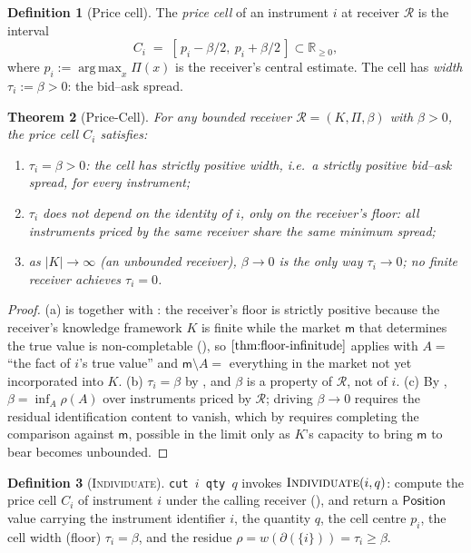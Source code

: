 \documentclass[11pt,a4paper]{article}
\theoremstyle{thmstyle}
\newtheorem{theorem}{Theorem}[section]
\theoremstyle{definition}
\newtheorem{definition}[theorem]{Definition}
\theoremstyle{remark}
\newcommand{\R}{\mathbb{R}}
\newcommand{\wt}{w}
\newcommand{\flo}{\beta}
\newcommand{\res}{\rho}
\newcommand{\cut}{\partial}
\newcommand{\medium}{\mathsf{m}}
\newcommand{\sh}[1]{\texttt{#1}}
\newcommand{\abs}[1]{\lvert#1\rvert}
\newcommand{\Rec}{\mathcal{R}}
\DeclareMathOperator*{\argmax}{arg\,max}
\begin{document}
\begin{definition}[Price cell]
\label{def:price-cell}
The \emph{price cell} of an instrument $i$ at receiver $\Rec$ is the
interval
\[
C_i \;=\; [\,p_i - \flo/2,\ p_i + \flo/2\,] \subset \R_{\ge0},
\]
where $p_i:=\argmax_x\Pi(x)$ is the receiver's central estimate. The
cell has \emph{width} $\tau_i:=\flo>0$: the bid--ask spread.
\end{definition}

\begin{theorem}[Price-Cell]
\label{thm:price-cell}
For any bounded receiver $\Rec=(K,\Pi,\flo)$ with $\flo>0$, the price
cell $C_i$ satisfies:
\begin{enumerate}[label=\textup{(\alph*)},leftmargin=2em]
\item $\tau_i=\flo>0$: the cell has strictly positive width, i.e.\ a
strictly positive bid--ask spread, for every instrument;
\item $\tau_i$ does not depend on the identity of $i$, only on the
receiver's floor: all instruments priced by the same receiver share the
same minimum spread;
\item as $\abs{K}\to\infty$ (an unbounded receiver), $\flo\to0$ is the
only way $\tau_i\to0$; no finite receiver achieves $\tau_i=0$.
\end{enumerate}
\end{theorem}

\begin{proof}
(a) is  together with : the
receiver's floor is strictly positive because the receiver's knowledge
framework $K$ is finite while the market $\medium$ that determines the
true value is non-completable (), so
$\Cref{thm:floor-infinitude}$ applies with $A=$ ``the fact of $i$'s true
value'' and $\medium\setminus A=$ everything in the market not yet
incorporated into $K$. (b) $\tau_i=\flo$ by , and
$\flo$ is a property of $\Rec$, not of $i$. (c) By
, $\flo=\inf_A\res(A)$ over instruments priced by
$\Rec$; driving $\flo\to0$ requires the residual identification content
to vanish, which by  requires completing the
comparison against $\medium$, possible in the limit only as $K$'s
capacity to bring $\medium$ to bear becomes unbounded.
\end{proof}

\begin{definition}[\textsc{Individuate}]
\label{def:individuate}
\sh{cut\ $i$\ qty\ $q$} invokes $\textsc{Individuate}(i,q)$: compute the
price cell $C_i$ of instrument $i$ under the calling receiver
(), and return a $\mathsf{Position}$ value carrying
the instrument identifier $i$, the quantity $q$, the cell centre $p_i$,
the cell width (floor) $\tau_i=\flo$, and the residue
$\res=\wt(\cut(\{i\}))=\tau_i\ge\flo$.
\end{definition}
\end{document}
